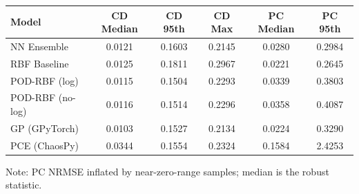 \begin{tabular}{l S S S S S}
\toprule
Model & {CD Median} & {CD 95th} & {CD Max} & {PC Median} & {PC 95th} \\
\midrule
NN Ensemble & 0.0121 & 0.1603 & 0.2145 & 0.0280 & 0.2984 \\
RBF Baseline & 0.0125 & 0.1811 & 0.2967 & 0.0221 & 0.2645 \\
POD-RBF (log) & 0.0115 & 0.1504 & 0.2293 & 0.0339 & 0.3803 \\
POD-RBF (no-log) & 0.0116 & 0.1514 & 0.2296 & 0.0358 & 0.4087 \\
GP (GPyTorch) & 0.0103 & 0.1527 & 0.2134 & 0.0224 & 0.3290 \\
PCE (ChaosPy) & 0.0344 & 0.1554 & 0.2324 & 0.1584 & 2.4253 \\
\bottomrule
\end{tabular}
\par\smallskip
{\footnotesize Note: PC NRMSE inflated by near-zero-range samples; median is the robust statistic.}
